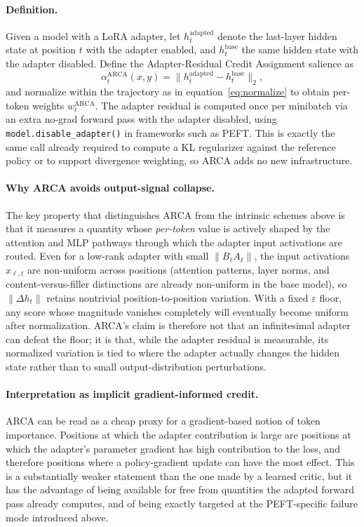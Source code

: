 \paragraph{Definition.}
Given a model with a LoRA adapter, let $h_t^{\mathrm{adapted}}$ denote the
last-layer hidden state at position $t$ with the adapter enabled, and
$h_t^{\mathrm{base}}$ the same hidden state with the adapter disabled.
Define the Adapter-Residual Credit Assignment salience as
\begin{equation}
\alpha_t^{\mathrm{ARCA}}(x, y) = \lVert h_t^{\mathrm{adapted}} -
h_t^{\mathrm{base}} \rVert_2,
\end{equation}
and normalize within the trajectory as in
equation~\eqref{eq:normalize} to obtain per-token weights
$w_t^{\mathrm{ARCA}}$. The adapter residual is computed once per minibatch
via an extra no-grad forward pass with the adapter disabled, using
\texttt{model.disable\_adapter()} in frameworks such as PEFT. This is exactly
the same call already required to compute a KL regularizer against the
reference policy or to support divergence weighting, so ARCA adds no new
infrastructure.

\paragraph{Why ARCA avoids output-signal collapse.}
The key property that distinguishes ARCA from the intrinsic schemes above is
that it measures a quantity whose \emph{per-token} value is actively shaped by
the attention and MLP pathways through which the adapter input activations are
routed. Even for a low-rank adapter with small $\|B_\ell A_\ell\|$, the
input activations $x_{\ell,t}$ are non-uniform across positions (attention
patterns, layer norms, and content-versus-filler distinctions are already
non-uniform in the base model), so $\|\Delta h_t\|$ retains nontrivial
position-to-position variation. With a fixed $\varepsilon$ floor, any score
whose magnitude vanishes completely will eventually become uniform after
normalization. ARCA's claim is therefore not that an infinitesimal adapter can
defeat the floor; it is that, while the adapter residual is measurable, its
normalized variation is tied to where the adapter actually changes the hidden
state rather than to small output-distribution perturbations.

\paragraph{Interpretation as implicit gradient-informed credit.}
ARCA can be read as a cheap proxy for a gradient-based notion of token
importance. Positions at which the adapter contribution is large are
positions at which the adapter's parameter gradient has high contribution to
the loss, and therefore positions where a policy-gradient update can have
the most effect. This is a substantially weaker statement than the one made
by a learned critic, but it has the advantage of being available for free
from quantities the adapted forward pass already computes, and of being
exactly targeted at the PEFT-specific failure mode introduced above.


